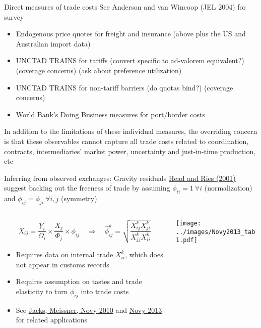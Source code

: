 \documentclass[10pt,notes=hide,aspectratio=169]{beamer}
\begin{document}
\begin{frame}{Direct measures of trade costs}
See Anderson and van Wincoop (JEL 2004) for survey
\begin{itemize}
	\item Endogenous price quotes for freight and insurance (above plus the US and Australian import data)
	\item UNCTAD TRAINS for tariffs (convert specific to ad-valorem equivalent?) (coverage concerns) (ask about preference utilization)
	\item UNCTAD TRAINS for non-tariff barriers (do quotas bind?) (coverage concerns)
	\item World Bank's Doing Business measures for port/border costs
\end{itemize}
In addition to the limitations of these individual measures,
the overriding concern is that these observables cannot capture all trade costs related to coordination, contracts, intermediaries' market power, uncertainty and just-in-time production, etc
\end{frame}
\begin{frame}{Inferring from observed exchanges: Gravity residuals}
\href{https://www.aeaweb.org/articles?id=10.1257/aer.91.4.858}{Head and Ries (2001)} suggest backing out the freeness of trade by assuming
$\phi_{ii}=1 \ \forall i$ (normalization) and $\phi_{ij}=\phi_{ji} \ \forall i,j$ (symmetry)
\begin{columns}
\begin{column}{.52\textwidth}
\begin{equation*}
X_{ij} = {\frac{Y_i}{\Omega_i}} \times {\frac{X_j}{\Phi_j}} \times \phi_{ij}
\quad \Rightarrow \quad
\hat{\phi}^k_{ij}=\sqrt{\frac{X^k_{ij}X^k_{ji}}{X^k_{jj}X^k_{ii}}}
\end{equation*}
\begin{itemize}
	\item Requires data on internal trade $X_{ii}^k$, which does not appear in customs records
	\item Requires assumption on tastes and trade elasticity to turn $\phi_{ij}$ into trade costs
	\item See \href{https://doi.org/10.1016/j.eeh.2009.07.001}{Jacks, Meissner, Novy 2010} and \href{https://doi.org/10.1111/j.1465-7295.2011.00439.x}{Novy 2013} for related applications
\end{itemize}
\end{column}
\begin{column}{.45\textwidth}
\texttt{[image: ../images/Novy2013\_tab1.pdf]}
\end{column}
\end{columns}
\end{frame}
\end{document}
